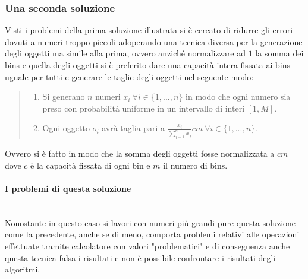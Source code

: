\subsubsection{Una seconda soluzione}
Visti i problemi della prima soluzione illustrata si è cercato di ridurre gli errori dovuti a numeri troppo piccoli adoperando
una tecnica diversa per la generazione degli oggetti ma simile alla prima, ovvero anziché normalizzare ad $ 1 $ la somma dei bins 
e quella degli oggetti si è preferito dare una capacità intera fissata ai bins uguale per tutti e generare le taglie degli oggetti nel
seguente modo:
\begin{quote}
	\begin{enumerate}
		\item Si generano $ n $ numeri $ x_i \: \forall i \in \{1, ..., n\} $ in modo che ogni numero sia preso con probabilità 
			  uniforme in un intervallo di interi $ [1, M] $.
		\item Ogni oggetto $ o_i $ avrà taglia pari a $ \displaystyle\frac{x_i}{\sum_{j=1}^n x_j}cm \: \forall i \in \{1, ..., n\} $. 
	\end{enumerate}
\end{quote}
Ovvero si è fatto in modo che la somma degli oggetti fosse normalizzata a $ cm $ dove $ c $ è la capacità fissata
di ogni bin e $ m $ il numero di bins.

\paragraph{I problemi di questa soluzione}\mbox{}\\
Nonostante in questo caso si lavori con numeri più grandi pure questa soluzione come la precedente, anche se di meno, comporta problemi relativi
alle operazioni effettuate tramite calcolatore con valori "problematici" e di conseguenza anche questa tecnica falsa i risultati e non è possibile confrontare
i risultati degli algoritmi.


